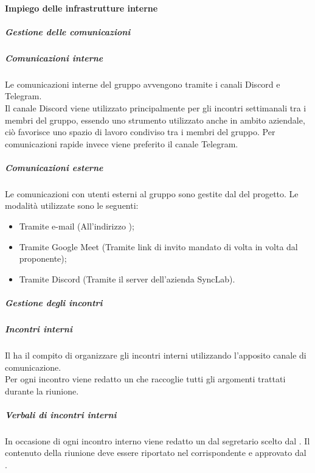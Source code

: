 \paragraph{Impiego delle infrastrutture interne} \label{subsection:infrastrutture_interne}

\subparagraph{Gestione delle comunicazioni}
\subparagraph*{Comunicazioni interne}
Le comunicazioni interne del gruppo \groupName{} avvengono tramite i canali Discord\glo{} e Telegram\glo{}.\\
Il canale Discord\glo{} viene utilizzato principalmente per gli incontri settimanali tra i membri del gruppo, essendo uno strumento utilizzato anche in ambito aziendale, ciò favorisce uno spazio di lavoro condiviso tra i membri del gruppo.
Per comunicazioni rapide invece viene preferito il canale Telegram\glo{}.

\subparagraph*{Comunicazioni esterne}
Le comunicazioni con utenti esterni al gruppo sono gestite dal \roleProjectManagerLow{} del progetto. Le modalità utilizzate sono le seguenti:
\begin {itemize}
\item Tramite e-mail (All'indirizzo \groupEmail{});
\item Tramite Google Meet\glo{} (Tramite link di invito mandato di volta in volta dal proponente);
\item Tramite Discord\glo{} (Tramite il server dell'azienda SyncLab).
\end {itemize}

\subparagraph{Gestione degli incontri}
\subparagraph*{Incontri interni}
Il \roleProjectManagerLow{} ha il compito di organizzare gli incontri interni utilizzando l'apposito canale di comunicazione.\\
Per ogni incontro viene redatto un \docNameVLow{} che raccoglie tutti gli argomenti trattati durante la riunione.
\subparagraph {\textit{Verbali} di incontri interni}
In occasione di ogni incontro interno viene redatto un \docNameVLow{} dal segretario scelto dal \roleProjectManagerLow{}. Il contenuto della riunione deve essere riportato nel \docNameVLow{} corrispondente e approvato dal \roleProjectManagerLow{}.

